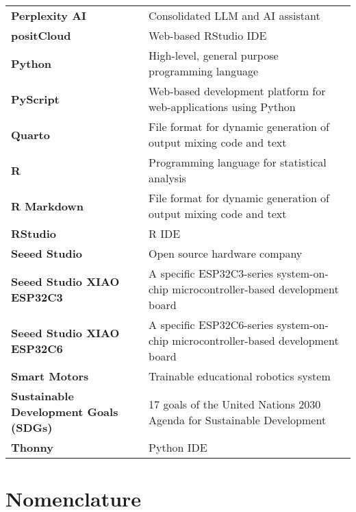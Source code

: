 {\begin{longtable}{>{\raggedright \bfseries}p{} p{}}
Perplexity AI       & Consolidated LLM and AI assistant  \\
positCloud          & Web-based RStudio IDE \\
Python              & High-level, general purpose programming language \\
PyScript            & Web-based development platform for web-applications using Python \\
Quarto              & File format for dynamic generation of output mixing code and text \\
R                   & Programming language for statistical analysis \\
R Markdown          & File format for dynamic generation of output mixing code and text \\
RStudio             & R IDE\\
Seeed Studio        & Open source hardware company \\
Seeed Studio XIAO ESP32C3 & A specific ESP32C3-series system-on-chip microcontroller-based development board \\
Seeed Studio XIAO ESP32C6 & A specific ESP32C6-series system-on-chip microcontroller-based development board\\
Smart Motors        & Trainable educational robotics system \\
Sustainable Development Goals (SDGs) & 17 goals of the United Nations 2030 Agenda for Sustainable Development \\
Thonny              & Python IDE \\

\end{longtable}
}

\chapter*{Nomenclature}%
%
%
%

